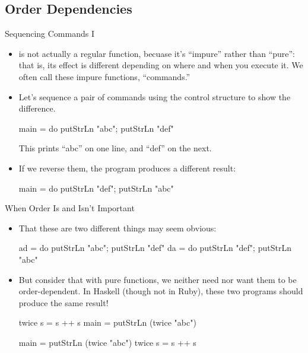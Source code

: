 \documentclass[xcolor=dvipsnames]{beamer}          %
\begin{document}
\subsection{Order Dependencies}

\begin{frame}[fragile]{Sequencing Commands I}
\begin{itemize}
    \item {} is not actually a regular function, becuase
        it's ``impure'' rather than ``pure'': that is, its effect is
        different depending on where and when you execute it. We often
        call these impure functions, ``commands.''
    \item Let's sequence a pair of commands using the  control
        structure to show the difference.
        \begin{hlisting}
            main = do { putStrLn "abc"; putStrLn "def" }
        \end{hlisting}
        This prints ``abc'' on one line, and ``def'' on the next.
    \item If we reverse them, the program produces a different result:
        \begin{hlisting}
            main = do { putStrLn "def"; putStrLn "abc" }
        \end{hlisting}
\end{itemize}
\end{frame}


\begin{frame}[fragile]{When Order Is and Isn't Important}
\begin{itemize}
    \item That these are two different things may seem obvious:
        \begin{hlisting}
            ad = do { putStrLn "abc"; putStrLn "def" }
            da = do { putStrLn "def"; putStrLn "abc" }
        \end{hlisting}
    \item But consider that with pure functions, we neither need nor
        want them to be order-dependent. In Haskell (though not in Ruby),
        these two programs should produce the same result!
        \begin{hlisting}
            twice s = s ++ s
            main = putStrLn (twice "abc")
        \end{hlisting}
        \begin{hlisting}
            main = putStrLn (twice "abc")
            twice s = s ++ s
        \end{hlisting}
\end{itemize}
\end{frame}
\end{document}
